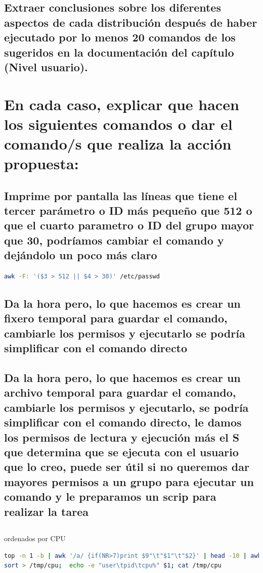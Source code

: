 \documentclass[preprint,11pt]{elsarticle}
\begin{document}
\subsection{Extraer conclusiones sobre los diferentes aspectos de cada distribución
después de haber ejecutado por lo menos 20 comandos de los sugeridos en
la documentación del capítulo (Nivel usuario).}


\section{En cada caso, explicar que hacen los siguientes comandos o dar el
comando/s que realiza la acción propuesta: }

\subsection{Imprime por pantalla las líneas que tiene el tercer parámetro o ID más pequeño que 512 o que el cuarto parametro o ID del grupo mayor que 30,  podríamos cambiar el comando y dejándolo un poco más claro}
\begin{lstlisting}[language=bash]
awk -F: '($3 > 512 || $4 > 30)' /etc/passwd  
\end{lstlisting}

\subsection{Da la hora pero, lo que hacemos es crear un fixero temporal para guardar el comando, cambiarle los permisos y ejecutarlo se podría simplificar con el comando directo}

\subsection{Da la hora pero, lo que hacemos es crear un archivo temporal para guardar el comando, cambiarle los permisos y ejecutarlo, se podría simplificar con el comando directo, le damos los permisos de lectura y ejecución más el S que determina que se ejecuta con el usuario que lo creo, puede ser útil si no queremos dar mayores permisos a un grupo para ejecutar un comando y le preparamos un scrip para realizar la tarea}

\subsection{}

ordenados por CPU 
\begin{lstlisting}[language=bash,  basicstyle=\tiny,]
top -n 1 -b | awk '/a/ {if(NR>7)print $9"\t"$1"\t"$2}' | head -10 | awk '{print $3"\t"$2"\t"$1}' |
sort > /tmp/cpu;  echo -e "user\tpid\tcpu%" $1; cat /tmp/cpu
\end{lstlisting}
\end{document}

